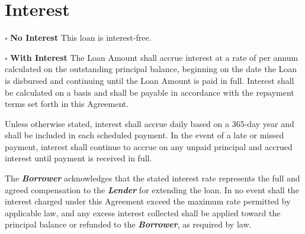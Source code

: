 
\section{Interest}
\label{sec:interest}

$\square$ \textbf{No Interest}
This loan is interest-free.

\vspace{0.3cm}

\noindent $\square$ \textbf{With Interest}
The Loan Amount shall accrue interest at a rate of \LoanInterest{} per annum calculated on the outstanding principal balance, beginning on the date the Loan is disbursed and continuing until the Loan Amount is paid in full. Interest shall be calculated on a \LoanInterestBase{} basis and shall be payable in accordance with the repayment terms set forth in this Agreement.

\vspace{0.3 cm}

\noindent Unless otherwise stated, interest shall accrue daily based on a 365-day year and shall be included in each scheduled payment. In the event of a late or missed payment, interest shall continue to accrue on any unpaid principal and accrued interest until payment is received in full.

\vspace{0.3 cm}

\noindent The \textbf{\textit{Borrower}} acknowledges that the stated interest rate represents the full and agreed compensation to the \textbf{\textit{Lender}} for extending the loan. In no event shall the interest charged under this Agreement exceed the maximum rate permitted by applicable law, and any excess interest collected shall be applied toward the principal balance or refunded to the \textbf{\textit{Borrower}}, as required by law.

